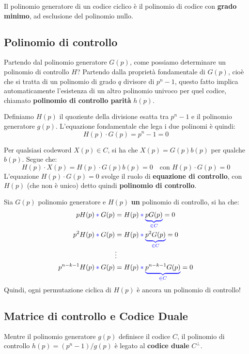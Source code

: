 Il polinomio generatore di un codice ciclico è il polinomio di codice con \textbf{grado minimo}, ad esclusione del polinomio nullo.

\subsection{Polinomio di controllo}
Partendo dal polinomio generatore $G(p)$, come possiamo determinare un polinomio di controllo $H$? Partendo dalla proprietà fondamentale di $G(p)$, cioè che si tratta di un polinomio di  grado $q$ divisore di $p^n - 1$, questo fatto 
implica automaticamente l'esistenza di un altro polinomio univoco per quel codice, chiamato \textbf{polinomio di controllo parità} $h(p)$.

Definiamo  $H(p)$ il quoziente della divisione esatta tra $p^n - 1$ e il polinomio generatore $g(p)$. L'equazione fondamentale che lega i due polinomi è quindi:
\[ H(p)\cdot G(p) = p^n - 1 = 0\]

Per qualsiasi codeword $X(p) \in C$, si ha che $X(p) = G(p)b(p)$ per qualche $b(p)$.
Segue che:
\[H(p) \cdot  X(p) = H(p) \cdot G(p)b(p) = 0 \quad \text{con } H(p) \cdot G(p)=0\]
L'equazione $H(p) \cdot G(p)=0$ svolge il ruolo di \textbf{equazione di controllo}, con $H(p)$  (che non è unico) detto quindi \textbf{polinomio di controllo}.

Sia $G(p)$ polinomio generatore e $H(p)$ \textbf{un} polinomio di controllo, si ha che:
\begin{align*}
    pH(p) \mathbin{\color{blue}*} G(p) &= H(p) \mathbin{\color{blue}*} \color{blue}\underbrace{\color{black}pG(p)}_{\in C} \color{black}= 0 \\
    p^2H(p) \mathbin{\color{blue}*} G(p) &= H(p) \mathbin{\color{blue}*} \color{blue}\underbrace{\color{black}p^2G(p)}_{\in C} \color{black}= 0 \\[-1ex]
    &\vdots \\
    p^{n-k-1}H(p) \mathbin{\color{blue}*} G(p) &= H(p) \mathbin{\color{blue}*} \color{blue}\underbrace{\color{black}p^{n-k-1}G(p)}_{\in C} \color{black}= 0
\end{align*}
Quindi, ogni permutazione ciclica di $H(p)$ è ancora un polinomio di controllo!

\subsection{Matrice di controllo e Codice Duale}
Mentre il polinomio generatore $g(p)$ definisce il codice $C$, il polinomio di controllo $h(p) = (p^n-1)/g(p)$ è legato al \textbf{codice duale} $C^\perp$. 

